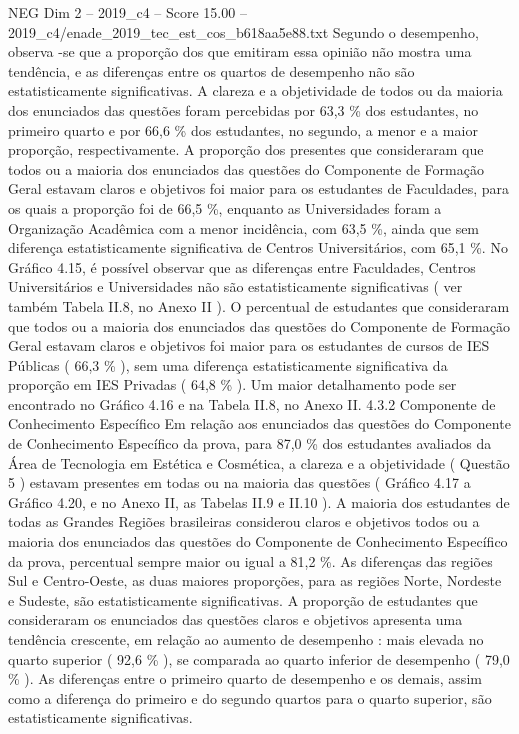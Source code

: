 \begin{textsample}{NEG Dim 2 – 2019\_c4 – Score 15.00 – 2019\_c4/enade\_2019\_tec\_est\_cos\_b618aa5e88.txt}
Segundo o desempenho, observa -se que a proporção dos que emitiram essa opinião não mostra uma tendência, e as diferenças entre os quartos de desempenho não são estatisticamente significativas.
A clareza e a objetividade de todos ou da maioria dos enunciados das questões foram percebidas por 63,3 \% dos estudantes, no primeiro quarto e por 66,6 \% dos estudantes, no segundo, a menor e a maior proporção, respectivamente.
A proporção dos presentes que consideraram que todos ou a maioria dos enunciados das questões do Componente de Formação Geral estavam claros e objetivos foi maior para os estudantes de Faculdades, para os quais a proporção foi de 66,5 \%, enquanto as Universidades foram a Organização Acadêmica com a menor incidência, com 63,5 \%, ainda que sem diferença estatisticamente significativa de Centros Universitários, com 65,1 \%.
No Gráfico 4.15, é possível observar que as diferenças entre Faculdades, Centros Universitários e Universidades não são estatisticamente significativas ( ver também Tabela II.8, no Anexo II ).
O percentual de estudantes que consideraram que todos ou a maioria dos enunciados das questões do Componente de Formação Geral estavam claros e objetivos foi maior para os estudantes de cursos de IES Públicas ( 66,3 \% ), sem uma diferença estatisticamente significativa da proporção em IES Privadas ( 64,8 \% ).
Um maior detalhamento pode ser encontrado no Gráfico 4.16 e na Tabela II.8, no Anexo II. 4.3.2 Componente de Conhecimento Específico Em relação aos enunciados das questões do Componente de Conhecimento Específico da prova, para 87,0 \% dos estudantes avaliados da Área de Tecnologia em Estética e Cosmética, a clareza e a objetividade ( Questão 5 ) estavam presentes em todas ou na maioria das questões ( Gráfico 4.17 a Gráfico 4.20, e no Anexo II, as Tabelas II.9 e II.10 ).
A maioria dos estudantes de todas as Grandes Regiões brasileiras considerou claros e objetivos todos ou a maioria dos enunciados das questões do Componente de Conhecimento Específico da prova, percentual sempre maior ou igual a 81,2 \%.
As diferenças das regiões Sul e Centro-Oeste, as duas maiores proporções, para as regiões Norte, Nordeste e Sudeste, são estatisticamente significativas.
A proporção de estudantes que consideraram os enunciados das questões claros e objetivos apresenta uma tendência crescente, em relação ao aumento de desempenho : mais elevada no quarto superior ( 92,6 \% ), se comparada ao quarto inferior de desempenho ( 79,0 \% ).
As diferenças entre o primeiro quarto de desempenho e os demais, assim como a diferença do primeiro e do segundo quartos para o quarto superior, são estatisticamente significativas.

\end{textsample}
